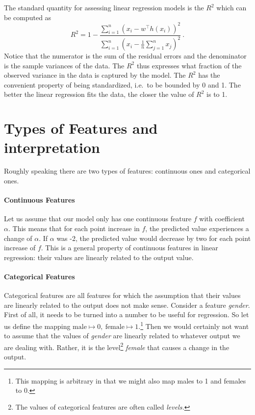 \documentclass[11pt, leqno, a4paper]{article}
\begin{document}
The standard quantity for assessing linear regression models is the 
\href{https://en.wikipedia.org/wiki/Coefficient_of_determination}{$ R^{2} $} which can be computed as
\begin{equation}
R^{2} = 1 - \frac{\sum_{i=1}^{n} \left( x_{i} - w^{\top}h(x_{i}) \right)^{2}}
{\sum_{i=1}^{n} \left(x_{i} - \frac{1}{n}\sum_{j = 1}^{n}x_{j}\right)^{2}} \ .
\end{equation}
Notice that the numerator is the sum of the residual errors 
and the denominator is the sample variances of the data.
The $ R^{2} $ thus expresses what fraction of the observed variance in the data is captured by the model. The 
$ R^{2} $ has the convenient property of being standardized, i.e.\ to
be bounded by 0 and 1. The better the linear regression fits the data,
the closer the value of $R^2$ is to 1.



\section{Types of Features and interpretation}

Roughly speaking there are two types of features: continuous ones and categorical ones.

\paragraph{Continuous Features} Let us assume that our model only has one continuous feature $ f $ 
with coefficient $ \alpha $. This means that for each point increase in $ f $, the predicted value
experiences a change of $ \alpha $. If $ \alpha $ was -2, the predicted value would decrease by two
for each point increase of $ f $. This is a general property of continuous features in linear
regression: their values are linearly related to the output value.

\paragraph{Categorical Features} Categorical features are all features for which the assumption
that their values are linearly related to the output does not make sense. Consider a feature \textit{gender}.
First of all, it needs to be turned into a number to be useful for regression. So let us
define the mapping $ \text{male} \mapsto 0, \ \text{female} \mapsto 1 $.\footnote{This mapping
is arbitrary in that we might also map males to 1 and females to 0.} Then we would certainly not
want to assume that the values of \textit{gender} are linearly related to whatever output we are dealing
with. Rather, it is the level\footnote{The values of categorical features are often called \textit{levels.}}
\textit{female} that causes a change in the output.
\end{document}
